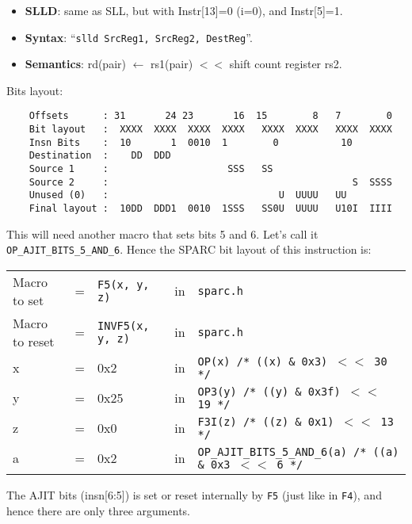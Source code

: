 \begin{enumerate}
\begin{enumerate}
    \begin{itemize}
    \item []\textbf{SLLD}: same as SLL, but with Instr[13]=0 (i=0),
      and Instr[5]=1.
    \item []\textbf{Syntax}: ``\texttt{slld SrcReg1, SrcReg2,
        DestReg}''.
    \item []\textbf{Semantics}: rd(pair) $\leftarrow$ rs1(pair) $<<$
      shift count register rs2.
    \end{itemize}
    Bits layout:
\begin{verbatim}
    Offsets      : 31       24 23       16  15        8   7        0
    Bit layout   :  XXXX  XXXX  XXXX  XXXX   XXXX  XXXX   XXXX  XXXX
    Insn Bits    :  10       1  0010  1        0           10        
    Destination  :    DD  DDD                                       
    Source 1     :                     SSS   SS
    Source 2     :                                           S  SSSS
    Unused (0)   :                              U  UUUU   UU        
    Final layout :  10DD  DDD1  0010  1SSS   SS0U  UUUU   U10I  IIII
\end{verbatim}

    This will need another macro that sets bits 5 and 6. Let's call it
    \texttt{OP\_AJIT\_BITS\_5\_AND\_6}.   Hence the  SPARC bit  layout of  this
    instruction is:

    \begin{tabular}[h]{lclcl}
      Macro to set  &=& \texttt{F5(x, y, z)} &in& \texttt{sparc.h}     \\
      Macro to reset  &=& \texttt{INVF5(x, y, z)} &in& \texttt{sparc.h}     \\
      x &=& 0x2      &in& \texttt{OP(x)  /* ((x) \& 0x3)  $<<$ 30 */} \\
      y &=& 0x25     &in& \texttt{OP3(y) /* ((y) \& 0x3f) $<<$ 19 */} \\
      z &=& 0x0      &in& \texttt{F3I(z) /* ((z) \& 0x1)  $<<$ 13 */} \\
      a &=& 0x2      &in& \texttt{OP\_AJIT\_BITS\_5\_AND\_6(a) /* ((a) \& 0x3  $<<$ 6 */}
    \end{tabular}

    The AJIT bits (insn[6:5]) is  set or reset internally by \texttt{F5}
    (just  like  in  \texttt{F4}),  and   hence  there  are  only  three
    arguments.


\end{enumerate}
\end{enumerate}
